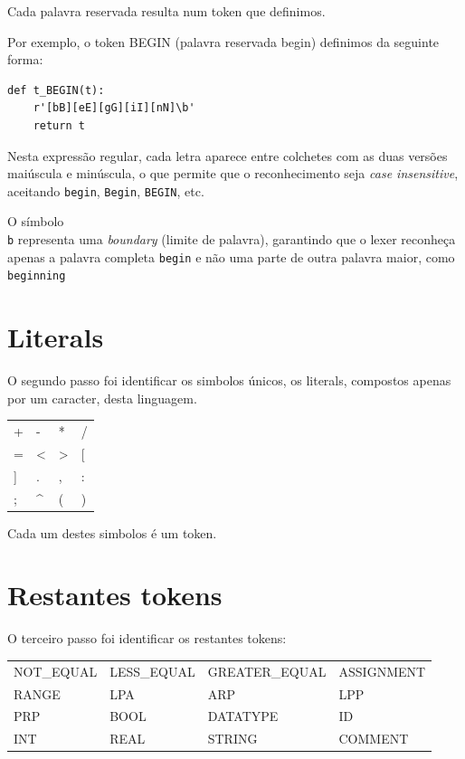 \documentclass[12pt,a4paper]{report}
\begin{document}
Cada palavra reservada resulta num token que definimos.

\vspace{1em}

Por exemplo, o token BEGIN (palavra reservada begin) definimos da seguinte forma:

\begin{verbatim}
def t_BEGIN(t):
    r'[bB][eE][gG][iI][nN]\b'
    return t
\end{verbatim}

Nesta expressão regular, cada letra aparece entre colchetes com as duas versões maiúscula e minúscula, o que permite que o reconhecimento seja \emph{case insensitive}, aceitando \texttt{begin}, \texttt{Begin}, \texttt{BEGIN}, etc.

O símbolo \texttt{\\b} representa uma \emph{boundary} (limite de palavra), garantindo que o lexer reconheça apenas a palavra completa \texttt{begin} e não uma parte de outra palavra maior, como \texttt{beginning}

\section{Literals}

O segundo passo foi identificar os simbolos únicos, os literals, compostos apenas por um caracter, desta linguagem.

\begin{center}
\begin{tabular}{>{\ttfamily} l >{\ttfamily} l >{\ttfamily} l >{\ttfamily} l}
\toprule
+ & - & * & / \\
= & < & > & [ \\
] & . & , & : \\
; & \^{} & ( & ) \\
\bottomrule
\end{tabular}
\end{center}

Cada um destes simbolos é um token.

\section{Restantes tokens}

O terceiro passo foi identificar os restantes tokens:
\begin{center}
\begin{tabular}{>{\ttfamily} l >{\ttfamily} l >{\ttfamily} l >{\ttfamily} l}
\toprule
NOT\_EQUAL & LESS\_EQUAL & GREATER\_EQUAL & ASSIGNMENT \\
RANGE & LPA & ARP & LPP \\
PRP & BOOL & DATATYPE & ID \\
INT & REAL & STRING & COMMENT \\
\bottomrule
\end{tabular}
\end{center}
\end{document}
